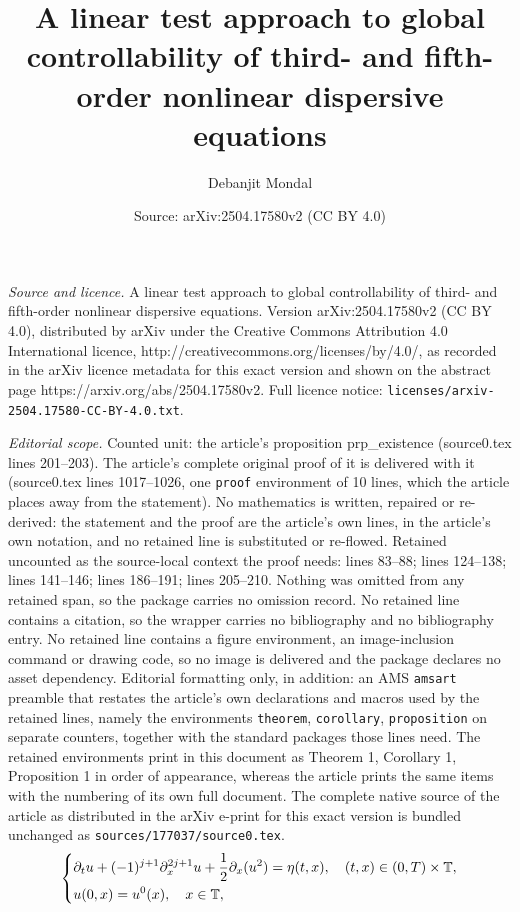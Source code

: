 \documentclass[10pt,a4paper]{amsart}
\title{A linear test approach to global controllability of third- and fifth-order nonlinear dispersive equations}
\author{Debanjit Mondal}
\date{Source: arXiv:2504.17580v2 (CC BY 4.0)}
\begin{document}
\maketitle

\noindent\emph{Source and licence.} A linear test approach to global controllability of third- and fifth-order nonlinear dispersive equations. Version arXiv:2504.17580v2 (CC BY 4.0), distributed by arXiv under the Creative Commons Attribution 4.0 International licence, http://creativecommons.org/licenses/by/4.0/, as recorded in the arXiv licence metadata for this exact version and shown on the abstract page https://arxiv.org/abs/2504.17580v2. Full licence notice: \texttt{licenses/arxiv-2504.17580-CC-BY-4.0.txt}.\par\smallskip

\noindent\textit{Editorial scope.} Counted unit: the article's proposition prp\_existence (source0.tex lines 201--203). The article's complete original proof of it is delivered with it (source0.tex lines 1017--1026, one \texttt{proof} environment of 10 lines, which the article places away from the statement). No mathematics is written, repaired or re-derived: the statement and the proof are the article's own lines, in the article's own notation, and no retained line is substituted or re-flowed.  Retained uncounted as the source-local context the proof needs: lines 83--88; lines 124--138; lines 141--146; lines 186--191; lines 205--210.  Nothing was omitted from any retained span, so the package carries no omission record.  No retained line contains a citation, so the wrapper carries no bibliography and no bibliography entry.  No retained line contains a figure environment, an image-inclusion command or drawing code, so no image is delivered and the package declares no asset dependency.  Editorial formatting only, in addition: an AMS \texttt{amsart} preamble that restates the article's own declarations and macros used by the retained lines, namely the environments \texttt{theorem}, \texttt{corollary}, \texttt{proposition} on separate counters, together with the standard packages those lines need.  The retained environments print in this document as Theorem 1, Corollary 1, Proposition 1 in order of appearance, whereas the article prints the same items with the numbering of its own full document.  The complete native source of the article as distributed in the arXiv e-print for this exact version is bundled unchanged as \texttt{sources/177037/source0.tex}.
\begin{align}\label{ctrl_prblm}  
	\begin{dcases}  
		\partial_t u + (-1)^{j + 1} \partial_x^{2j + 1} u + \frac{1}{2} \partial_x(u^2) = \eta(t, x), \quad (t, x) \in (0, T) \times \mathbb{T}, \\  
		u(0, x) = u^0 (x), \quad x \in \mathbb{T},  
	\end{dcases}  
\end{align}  
\end{document}
